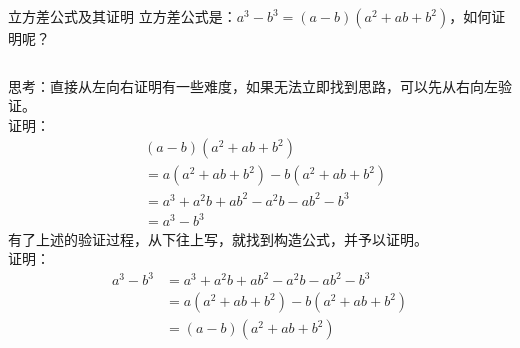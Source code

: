 \documentclass[aspectratio=169]{ctexbeamer} %
\begin{document}
\begin{frame}[t]{立方差公式及其证明}
立方差公式是：$a^3 - b^3 = (a - b)(a^2+ab+b^2)$，如何证明呢？
\vspace{1cm}
\begin{columns}[t]
思考：直接从左向右证明有一些难度，如果无法立即找到思路，可以先从右向左验证。\\
证明：
\begin{align*}
  &(a - b)(a^2 + ab + b^2) \\
  &= a(a^2 +ab + b^2) - b(a^2 +ab + b^2)  \\
  &= a^3 + a^2b + ab^2 - a^2b - ab^2 - b^3 \\
  &= a^3  - b^3 
\end{align*}
 有了上述的验证过程，从下往上写，就找到构造公式，并予以证明。\\
 证明：
\begin{align*}
  a^3 - b^3  &= a^3 + a^2b + ab^2 - a^2b - ab^2 - b^3 \\
  &= a(a^2 + ab + b^2) - b(a^2 + ab + b^2) \\
  &= (a-b)(a^2 + ab + b^2)
 \end{align*}
\end{columns}
\end{frame}
\end{document}
